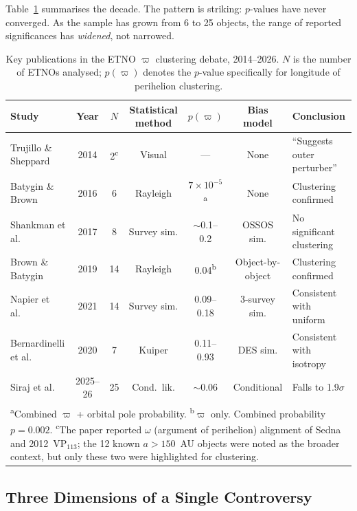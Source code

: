 \documentclass[12pt,a4paper]{article}
\begin{document}
Table~\ref{tab:timeline} summarises the decade. The pattern is striking: $p$-values have never converged. As the sample has grown from 6 to 25 objects, the range of reported significances has \textit{widened}, not narrowed.

\begin{table}[h]
\centering
\caption{Key publications in the ETNO $\varpi$ clustering debate, 2014--2026. $N$ is the number of ETNOs analysed; $p(\varpi)$ denotes the $p$-value specifically for longitude of perihelion clustering.}
\label{tab:timeline}
\footnotesize
\begin{tabular}{lcccccl}
\hline
Study & Year & $N$ & Statistical method & $p(\varpi)$ & Bias model & Conclusion \\
\hline
Trujillo \& Sheppard \cite{trujillo2014} & 2014 & 2\textsuperscript{c} & Visual & --- & None & ``Suggests outer perturber'' \\
Batygin \& Brown \cite{batygin2016} & 2016 & 6 & Rayleigh & $7\times10^{-5}$\textsuperscript{a} & None & Clustering confirmed \\
Shankman et al.\ \cite{shankman2017} & 2017 & 8 & Survey sim. & $\sim$0.1--0.2 & OSSOS sim. & No significant clustering \\
Brown \& Batygin \cite{brown2019} & 2019 & 14 & Rayleigh & 0.04\textsuperscript{b} & Object-by-object & Clustering confirmed \\
Napier et al.\ \cite{napier2021} & 2021 & 14 & Survey sim. & 0.09--0.18 & 3-survey sim. & Consistent with uniform \\
Bernardinelli et al.\ \cite{bernardinelli2020} & 2020 & 7 & Kuiper & 0.11--0.93 & DES sim. & Consistent with isotropy \\
Siraj et al.\ \cite{siraj2025,siraj2026} & 2025--26 & 25 & Cond.\ lik. & $\sim$0.06 & Conditional & Falls to 1.9$\sigma$ \\
\hline
\multicolumn{7}{l}{\footnotesize\textsuperscript{a}Combined $\varpi$ + orbital pole probability. \textsuperscript{b}$\varpi$ only. Combined probability $p=0.002$. \textsuperscript{c}The paper reported $\omega$ (argument of perihelion) alignment of Sedna and 2012~VP$_{113}$; the 12 known $a>150$~AU objects were noted as the broader context, but only these two were highlighted for clustering.} \\
\end{tabular}
\end{table}

\subsection{Three Dimensions of a Single Controversy}
\end{document}
